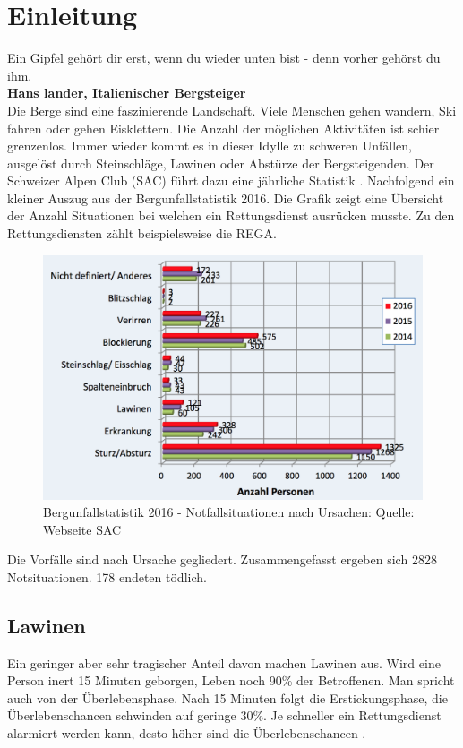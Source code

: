 \documentclass[11pt,english,german]{report}
\theoremstyle{definition}
\begin{document}
\chapter{Einleitung}
Ein Gipfel gehört dir erst, wenn du wieder unten bist - denn vorher gehörst du ihm.\\[0.3cm]
\textbf{Hans lander, Italienischer Bergsteiger\cite{kammerlander}} \\[0.5cm]
\noindent
Die Berge sind eine faszinierende Landschaft. Viele Menschen gehen wandern, Ski fahren oder gehen Eisklettern. Die Anzahl der möglichen Aktivitäten ist schier grenzenlos. Immer wieder kommt es in dieser Idylle zu schweren Unfällen, ausgelöst durch Steinschläge, Lawinen oder Abstürze der Bergsteigenden. Der Schweizer Alpen Club (SAC) führt dazu eine jährliche Statistik \cite{sacaccident}. Nachfolgend ein kleiner Auszug aus der Bergunfallstatistik 2016. Die Grafik zeigt eine Übersicht der Anzahl Situationen bei welchen ein Rettungsdienst ausrücken musste. Zu den Rettungsdiensten zählt beispielsweise die REGA.\\
\begin{figure}[H]
	\centering
	\includegraphics[width=\textwidth]{img/alps/sac_accidentstatistic_2016_reason.png}
	\caption[Bergunfallstatistik 2016 - Notfallsituationen nach Unrsachen]
	{Bergunfallstatistik 2016 - Notfallsituationen nach Ursachen: Quelle: Webseite SAC \cite{sacaccident}}
\end{figure}
\noindent
Die Vorfälle sind nach Ursache gegliedert. Zusammengefasst ergeben sich 2828 Notsituationen. 178 endeten tödlich.
\section{Lawinen}
Ein geringer aber sehr tragischer Anteil davon machen Lawinen aus. Wird eine Person inert 15 Minuten geborgen, Leben noch 90\% der Betroffenen. Man spricht auch von der Überlebensphase. Nach 15 Minuten folgt die Erstickungsphase, die Überlebenschancen schwinden auf geringe 30\%. Je schneller ein Rettungsdienst alarmiert werden kann, desto höher sind die Überlebenschancen \cite{avalancheaccident}. 
\end{document}
